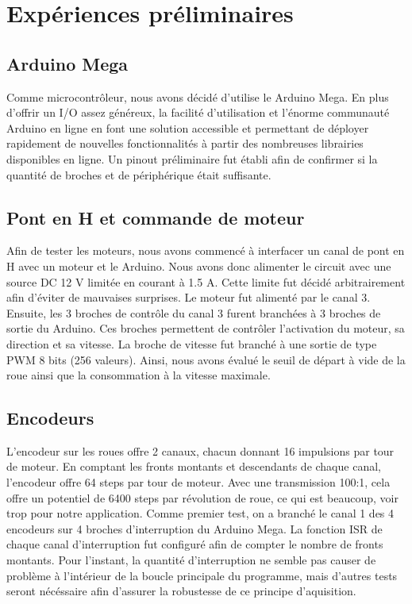 \chapter{Expériences préliminaires}

\section{Arduino Mega}

Comme microcontrôleur, nous avons décidé d’utilise le Arduino Mega. En plus d’offrir un I/O assez généreux, la facilité d’utilisation et l’énorme communauté Arduino en ligne en font une solution accessible et permettant de déployer rapidement de nouvelles fonctionnalités à partir des nombreuses librairies disponibles en ligne. Un pinout préliminaire fut établi afin de confirmer si la quantité de broches et de périphérique était suffisante.

\section{Pont en H et commande de moteur}

Afin de tester les moteurs, nous avons commencé à interfacer un canal de pont en H avec un moteur et le Arduino. Nous avons donc alimenter le circuit avec une source DC 12 V limitée en courant à 1.5 A. Cette limite fut décidé arbitrairement afin d'éviter de mauvaises surprises. Le moteur fut alimenté par le canal 3. Ensuite, les 3 broches de contrôle du canal 3 furent branchées à 3 broches de sortie du Arduino. Ces broches permettent de contrôler l'activation du moteur, sa direction et sa vitesse.  La broche de vitesse fut branché à une sortie de type PWM 8 bits (256 valeurs). Ainsi, nous avons évalué le seuil de départ à vide de la roue ainsi que la consommation à la vitesse maximale. 

\section{Encodeurs}

L'encodeur sur les roues offre 2 canaux, chacun donnant 16 impulsions par tour de moteur. En comptant les fronts montants et descendants de chaque canal, l'encodeur offre 64 steps par tour de moteur. Avec une transmission 100:1, cela offre un potentiel de 6400 steps par révolution de roue, ce qui est beaucoup, voir trop pour notre application.  Comme premier test, on a branché le canal 1 des 4 encodeurs sur 4 broches d'interruption du Arduino Mega. La fonction ISR de chaque canal d'interruption fut configuré afin de compter le nombre de fronts montants. Pour l'instant, la quantité d'interruption ne semble pas causer de problème à l'intérieur de la boucle principale du programme, mais d'autres tests seront nécéssaire afin d'assurer la robustesse de ce principe d'aquisition.

